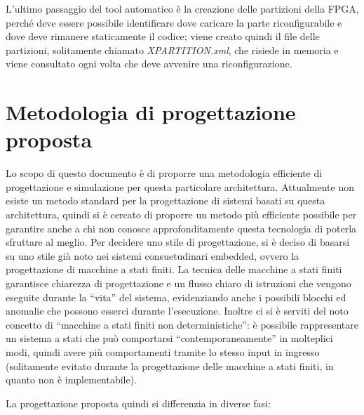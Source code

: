 \documentclass[a4paper,titlepage]{book}
\begin{document}
L'ultimo passaggio del tool automatico è la creazione delle partizioni della FPGA, perché deve essere possibile identificare dove caricare la parte riconfigurabile e dove deve rimanere staticamente il codice; viene creato quindi il file delle partizioni, solitamente chiamato \textit{XPARTITION.xml}, che risiede in memoria e viene consultato ogni volta che deve avvenire una riconfigurazione.

\chapter{Metodologia di progettazione proposta}

Lo scopo di questo documento è di proporre una metodologia efficiente di progettazione e simulazione per questa particolare architettura. Attualmente non esiste un metodo standard per la progettazione di sistemi basati su questa architettura, quindi si è cercato di proporre un metodo più efficiente possibile per garantire anche a chi non conosce approfonditamente questa tecnologia di poterla sfruttare al meglio.
Per decidere uno stile di progettazione, si è deciso di basarsi su uno stile già noto nei sistemi consuetudinari embedded, ovvero la progettazione di macchine a stati finiti. La tecnica delle macchine a stati finiti garantisce chiarezza di progettazione e un flusso chiaro di istruzioni che vengono eseguite durante la ``vita'' del sistema, evidenziando anche i possibili blocchi ed anomalie che possono esserci durante l'esecuzione. Inoltre ci si è serviti del noto concetto di ``macchine a stati finiti non deterministiche'': è possibile rappresentare un sistema a stati che può comportarsi ``contemporaneamente'' in molteplici modi, quindi avere più comportamenti tramite lo stesso input in ingresso (solitamente evitato durante la progettazione delle macchine a stati finiti, in quanto non è implementabile).

La progettazione proposta quindi si differenzia in diverse fasi:
\end{document}
